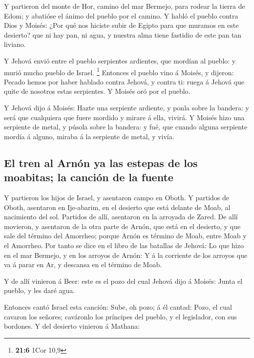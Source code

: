  Y partieron del monte de Hor, camino del mar Bermejo, para
rodear la tierra de Edom; y abatióse el ánimo del pueblo por el camino.
 Y habló el pueblo contra Dios y Moisés: ¿Por qué nos
hiciste subir de Egipto para que muramos en este desierto? que ni hay
pan, ni agua, y nuestra alma tiene fastidio de este pan tan liviano.

 Y Jehová envió entre el pueblo serpientes ardientes, que
mordían al pueblo: y murió mucho pueblo de Israel. \footnote{\textbf{21:6}
  1Cor 10,9}  Entonces el pueblo vino á Moisés, y dijeron:
Pecado hemos por haber hablado contra Jehová, y contra ti: ruega á
Jehová que quite de nosotros estas serpientes. Y Moisés oró por el
pueblo.

 Y Jehová dijo á Moisés: Hazte una serpiente ardiente, y
ponla sobre la bandera: y será que cualquiera que fuere mordido y mirare
á ella, vivirá.  Y Moisés hizo una serpiente de metal, y
púsola sobre la bandera: y fué, que cuando alguna serpiente mordía á
alguno, miraba á la serpiente de metal, y vivía.

\hypertarget{el-tren-al-arnuxf3n-ya-las-estepas-de-los-moabitas-la-canciuxf3n-de-la-fuente}{%
\subsection{El tren al Arnón ya las estepas de los moabitas; la canción
de la
fuente}\label{el-tren-al-arnuxf3n-ya-las-estepas-de-los-moabitas-la-canciuxf3n-de-la-fuente}}

 Y partieron los hijos de Israel, y asentaron campo en
Oboth.  Y partidos de Oboth, asentaron en Ije-abarim, en el
desierto que está delante de Moab, al nacimiento del sol. 
Partidos de allí, asentaron en la arroyada de Zared.  De
allí movieron, y asentaron de la otra parte de Arnón, que está en el
desierto, y que sale del término del Amorrheo; porque Arnón es término
de Moab, entre Moab y el Amorrheo.  Por tanto se dice en el
libro de las batallas de Jehová: Lo que hizo en el mar Bermejo, y en los
arroyos de Arnón:  Y á la corriente de los arroyos que va á
parar en Ar, y descansa en el término de Moab.

 Y de allí vinieron á Beer: este es el pozo del cual Jehová
dijo á Moisés: Junta el pueblo, y les daré agua.

 Entonces cantó Israel esta canción: Sube, oh pozo; á él
cantad:  Pozo, el cual cavaron los señores; caváronlo los
príncipes del pueblo, y el legislador, con sus bordones. Y del desierto
vinieron á Mathana:


